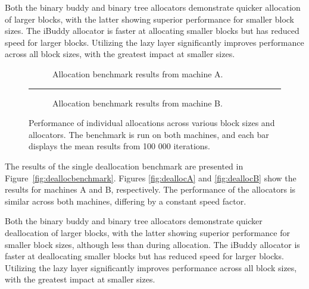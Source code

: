 Both the binary buddy and binary tree allocators demonstrate quicker allocation of larger blocks, with the latter showing superior performance for smaller block sizes. The iBuddy allocator is faster at allocating smaller blocks but has reduced speed for larger blocks. Utilizing the lazy layer significantly improves performance across all block sizes, with the greatest impact at smaller sizes.

\begin{figure}[h]
    \centering
    \begin{subfigure}{\textwidth}
        \centering
        \captionsetup{justification=centering}
        
        \caption{Allocation benchmark results from machine A.}
        \label{fig:allocA}
    \end{subfigure}
    \vspace{-0.5cm}
    \rule{\textwidth}{0.1pt}
    \begin{subfigure}{\textwidth}
        \centering
        \captionsetup{justification=centering}
        
        \caption{Allocation benchmark results from machine B.}
        \label{fig:allocB}
    \end{subfigure}
    \caption{Performance of individual allocations across various block sizes and allocators. The benchmark is run on both machines, and each bar displays the mean results from 100 000 iterations.}
    \label{fig:allocbenchmark}
\end{figure}
\FloatBarrier

The results of the single deallocation benchmark are presented in Figure~\ref{fig:deallocbenchmark}. Figures \ref{fig:deallocA} and \ref{fig:deallocB} show the results for machines A and B, respectively. The performance of the allocators is similar across both machines, differing by a constant speed factor.

Both the binary buddy and binary tree allocators demonstrate quicker deallocation of larger blocks, with the latter showing superior performance for smaller block sizes, although less than during allocation. The iBuddy allocator is faster at deallocating smaller blocks but has reduced speed for larger blocks. Utilizing the lazy layer significantly improves performance across all block sizes, with the greatest impact at smaller sizes.

